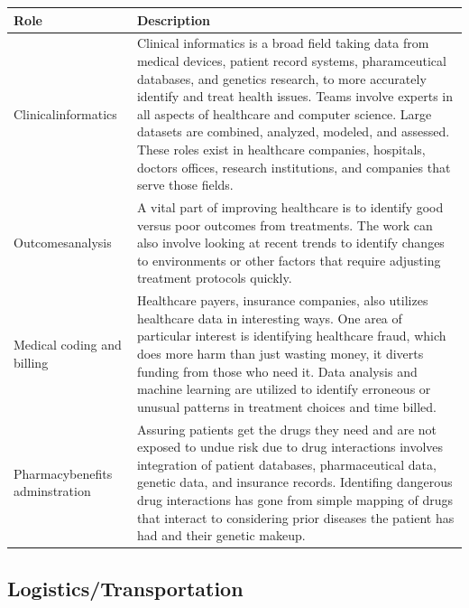 \begin{table}[H]
	\begin{center}
		\begin{tabular}{p{1in}|p{3.4in}} 
			\textbf{Role} & \textbf{Description}\\
			\hline
			Clinical\linebreak informatics & Clinical informatics is a broad field taking data from medical devices, patient record systems, pharamceutical databases, and genetics research, to more accurately identify and treat health issues. Teams involve experts in all aspects of healthcare and computer science. Large datasets are combined, analyzed, modeled, and assessed. These roles exist in healthcare companies, hospitals, doctors offices, research institutions, and companies that serve those fields.\\
			\hline
			Outcomes\linebreak analysis & A vital part of improving healthcare is to identify good versus poor outcomes from treatments. The work can also involve looking at recent trends to identify changes to environments or other factors that require adjusting treatment protocols quickly.\\
			\hline
			Medical coding and billing & Healthcare payers, insurance companies, also utilizes healthcare data in interesting ways. One area of particular interest is identifying healthcare fraud, which does more harm than just wasting money, it diverts funding from those who need it. Data analysis and machine learning are utilized to identify erroneous or unusual patterns in treatment choices and time billed.\\
			\hline
			Pharmacy\linebreak benefits adminstration & Assuring patients get the drugs they need and are not exposed to undue risk due to drug interactions involves integration of patient databases, pharmaceutical data, genetic data, and insurance records. Identifing dangerous drug interactions has gone from simple mapping of drugs that interact to considering prior diseases the patient has had and their genetic makeup.\\
			\hline
		\end{tabular}
	\end{center}
\end{table}

\subsection{Logistics/Transportation}

